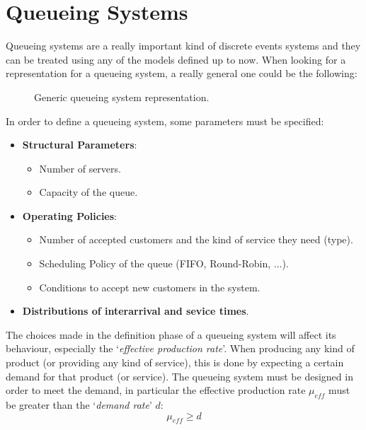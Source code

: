 \documentclass[12pt,a4paper]{article}
\begin{document}
\section{Queueing Systems}
\label{sec:QS}
Queueing systems are a really important kind of discrete events systems and they can be treated using any of the models defined up to now. When looking for a representation for a queueing system, a really general one could be the following:
\begin{figure}[H]
\begin{center}
\caption{\small Generic queueing system representation.}
\label{fig:QueuingSys}
\end{center}
\end{figure}
In order to define a queueing system, some parameters must be specified:
\begin{itemize}
\item \textbf{Structural Parameters}:
	\begin{itemize}
	\item Number of servers.
	\item Capacity of the queue.
	\end{itemize}
\item \textbf{Operating Policies}:
	\begin{itemize}
	\item Number of accepted customers and the kind of service they need (type).
	\item Scheduling Policy of the queue (FIFO, Round-Robin, ...).
	\item Conditions to accept new customers in the system.
	\end{itemize}
\item \textbf{Distributions of interarrival and sevice times}.
\end{itemize}
The choices made in the definition phase of a queueing system will affect its behaviour, especially the 
`\textit{effective production rate}'. When producing any kind of product (or providing any kind of service), this is done by expecting a certain demand for that product (or service). The queueing system must be designed in order to meet the demand, in particular the effective production rate $\mu_{eff}$ must be greater than the `\textit{demand rate}' $d$:
$$
\mu_{eff}\geq d
$$
\newpage
\end{document}
